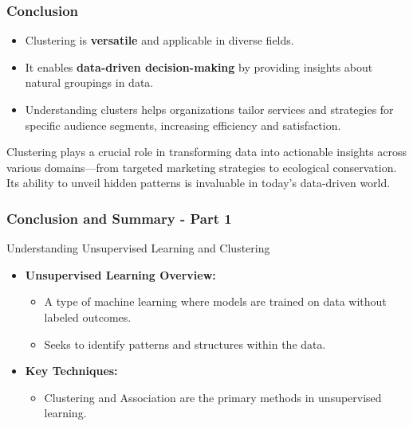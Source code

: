 \documentclass[aspectratio=169]{beamer}
\begin{document}
\begin{frame}[fragile]
    \frametitle{Conclusion}
    \begin{itemize}
        \item Clustering is \textbf{versatile} and applicable in diverse fields.
        \item It enables \textbf{data-driven decision-making} by providing insights about natural groupings in data.
        \item Understanding clusters helps organizations tailor services and strategies for specific audience segments, increasing efficiency and satisfaction.
    \end{itemize}
    
    Clustering plays a crucial role in transforming data into actionable insights across various domains—from targeted marketing strategies to ecological conservation. Its ability to unveil hidden patterns is invaluable in today's data-driven world.
\end{frame}

\begin{frame}[fragile]
    \frametitle{Conclusion and Summary - Part 1}

    \begin{block}{Understanding Unsupervised Learning and Clustering}
        \begin{itemize}
            \item \textbf{Unsupervised Learning Overview:}
            \begin{itemize}
                \item A type of machine learning where models are trained on data without labeled outcomes.
                \item Seeks to identify patterns and structures within the data.
            \end{itemize}
            \item \textbf{Key Techniques:} 
            \begin{itemize}
                \item Clustering and Association are the primary methods in unsupervised learning.
            \end{itemize}
        \end{itemize}
    \end{block}
\end{frame}
\end{document}
